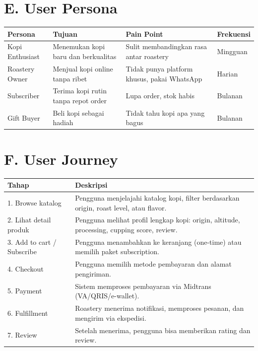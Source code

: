 \documentclass[11pt,a4paper]{article}
\begin{document}
\section{E. User Persona}
\noindent\small
\begin{tabularx}{\textwidth}{|p{2.5cm}|X|X|p{2cm}|}
\hline
\centering\textbf{Persona}\arraybackslash & \centering\textbf{Tujuan}\arraybackslash & \centering\textbf{Pain Point}\arraybackslash & \centering\textbf{Frekuensi}\arraybackslash \\\hline
Kopi Enthusiast & Menemukan kopi baru dan berkualitas & Sulit membandingkan rasa antar roastery & Mingguan \\\hline
Roastery Owner & Menjual kopi online tanpa ribet & Tidak punya platform khusus, pakai WhatsApp & Harian \\\hline
Subscriber & Terima kopi rutin tanpa repot order & Lupa order, stok habis & Bulanan \\\hline
Gift Buyer & Beli kopi sebagai hadiah & Tidak tahu kopi apa yang bagus & Bulanan \\\hline
\end{tabularx}\normalsize

\section{F. User Journey}
\noindent\small
\begin{tabularx}{\textwidth}{|p{3.5cm}|X|}
\hline
\centering\textbf{Tahap}\arraybackslash & \centering\textbf{Deskripsi}\arraybackslash \\\hline
1. Browse katalog & Pengguna menjelajahi katalog kopi, filter berdasarkan origin, roast level, atau flavor. \\\hline
2. Lihat detail produk & Pengguna melihat profil lengkap kopi: origin, altitude, processing, cupping score, review. \\\hline
3. Add to cart / Subscribe & Pengguna menambahkan ke keranjang (one-time) atau memilih paket subscription. \\\hline
4. Checkout & Pengguna memilih metode pembayaran dan alamat pengiriman. \\\hline
5. Payment & Sistem memproses pembayaran via Midtrans (VA/QRIS/e-wallet). \\\hline
6. Fulfillment & Roastery menerima notifikasi, memproses pesanan, dan mengirim via ekspedisi. \\\hline
7. Review & Setelah menerima, pengguna bisa memberikan rating dan review. \\\hline
\end{tabularx}\normalsize
\end{document}
